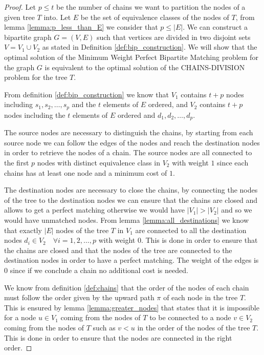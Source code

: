 \begin{proof}
    Let $p \leq t$ be the number of chains we want to partition the nodes of a given tree $T$ into. Let $E$ be the set of equivalence classes of the nodes of $T$, from lemma \ref{lemma:p_less_than_E} we consider that $p \leq |E|$. We can construct a bipartite graph $G = (V, E)$ such that vertices are divided in two disjoint sets $V = V_1 \cup V_2$ as stated in Definition \ref{def:bip_construction}. We will show that the optimal solution of the Minimum Weight Perfect Bipartite Matching problem for the graph $G$ is equivalent to the optimal solution of the \textsc{CHAINS-DIVISION} problem for the tree $T$.

    From definition \ref{def:bip_construction} we know that $V_1$ contains $t + p$ nodes including $s_1, s_2, \dots, s_p$ and the $t$ elements of $E$ ordered, and $V_2$ contains $t + p$ nodes including the $t$ elements of $E$ ordered and $d_1, d_2, \dots, d_p$.

    The source nodes are necessary to distinguish the chains, by starting from each source node we can follow the edges of the nodes and reach the destination nodes in order to retrieve the nodes of a chain. The source nodes are all connected to the first $p$ nodes with distinct equivalence class in $V_2$ with weight $1$ since each chains has at least one node and a minimum cost of $1$.

    The destination nodes are necessary to close the chains, by connecting the nodes of the tree to the destination nodes we can ensure that the chains are closed and allows to get a perfect matching otherwise we would have $|V_1| > |V_2|$ and so we would have unmatched nodes. From lemma \ref{lemma:all_destinations} we know that exactly $|E|$ nodes of the tree $T$ in $V_1$ are connected to all the destination nodes $d_i \in V_2 \quad \forall i = 1, 2, \dots, p$ with weight $0$. This is done in order to ensure that the chains are closed and that the nodes of the tree are connected to the destination nodes in order to have a perfect matching. The weight of the edges is $0$ since if we conclude a chain no additional cost is needed.

    We know from definition \ref{def:chains} that the order of the nodes of each chain must follow the order given by the upward path $\pi$ of each node in the tree $T$. This is ensured by lemma \ref{lemma:greater_nodes} that states that it is impossible for a node $u \in V_1$ coming from the nodes of $T$ to be connected to a node $v \in V_2$ coming from the nodes of $T$ such as $v < u$ in the order of the nodes of the tree $T$. This is done in order to ensure that the nodes are connected in the right order.


\end{proof}
